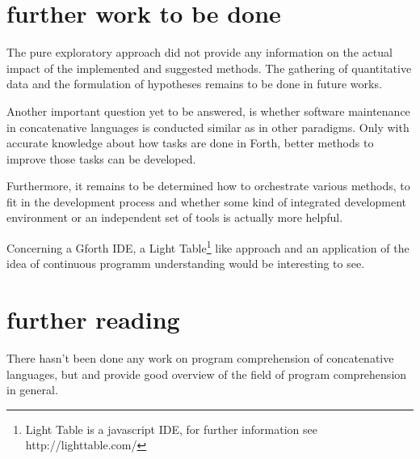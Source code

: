 \section{further work to be done}

The pure exploratory approach did not provide any information on the actual impact of the implemented and suggested methods. The gathering of quantitative data and the formulation of hypotheses remains to be done in future works.

Another important question yet to be answered, is whether software maintenance in concatenative languages is conducted similar as in other paradigms. Only with accurate knowledge about how tasks are done in Forth, better methods to improve those tasks can be developed.

Furthermore, it remains to be determined how to orchestrate various methods, to fit in the development process and whether some kind of integrated development environment or an independent set of tools is actually more helpful.

Concerning a Gforth IDE, a Light Table\footnote{Light Table is a javascript IDE, for further information see http://lighttable.com/} like approach and an application of the idea of continuous programm understanding\cite{Muller:2000:RER:336512.336526} would be interesting to see.


\section{further reading}

There hasn't been done any work on program comprehension of concatenative languages, but \cite{Canfora:2011:ACS:1924421.1924451} and \cite{Cornelissen2009} provide good overview of the field of program comprehension in general.